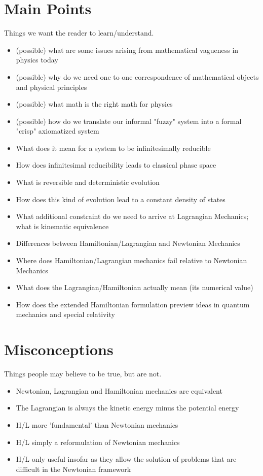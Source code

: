 \documentclass{article}
\begin{document}
\section{Main Points}
Things we want the reader to learn/understand.


\begin{itemize}
\item (possible) what are some issues arising from mathematical vagueness in physics today
\item (possible) why do we need one to one correspondence of mathematical objects and physical principles
\item (possible) what math is the right math for physics
\item (possible) how do we translate our informal "fuzzy" system into a formal "crisp" axiomatized system

	\item What does it mean for a system to be infinitesimally reducible
	\item How does infinitesimal reducibility leads to classical phase space
	\item What is reversible and deterministic evolution
	\item How does this kind of evolution lead to a constant density of states
	\item What additional constraint do we need to arrive at Lagrangian Mechanics; what is kinematic equivalence
	\item Differences between Hamiltonian/Lagrangian and Newtonian Mechanics
	\item Where does Hamiltonian/Lagrangian mechanics fail relative to Newtonian Mechanics
	\item What does the Lagrangian/Hamiltonian actually mean (its numerical value)
	\item How does the extended Hamiltonian formulation preview ideas in quantum mechanics and special relativity
\end{itemize}


\section{Misconceptions}
Things people may believe to be true, but are not.

\begin{itemize}
	\item Newtonian, Lagrangian and Hamiltonian mechanics are equivalent
	\item The Lagrangian is always the kinetic energy minus the potential energy 
	\item H/L more 'fundamental' than Newtonian mechanics
	\item H/L simply a reformulation of Newtonian mechanics
	\item H/L only useful insofar as they allow the solution of problems that are difficult in the Newtonian framework
\end{itemize}
\end{document}
